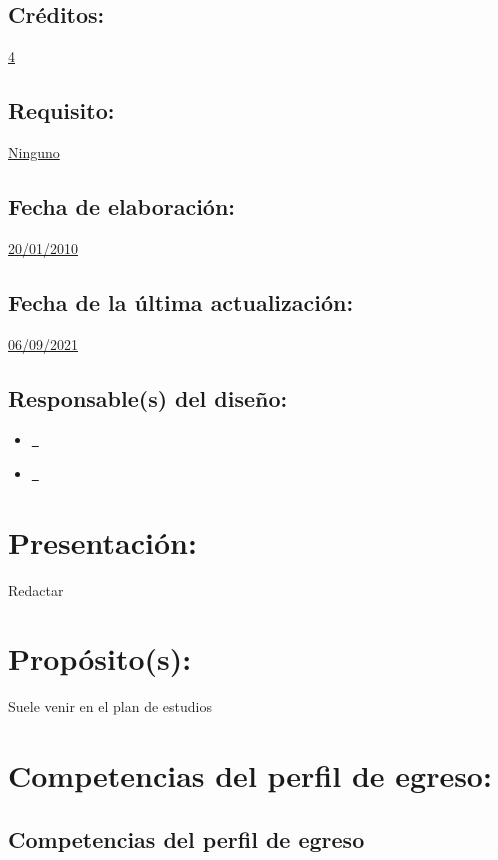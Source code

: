 \documentclass[10 pt]{article}
\begin{document}
\subsection{Cr\'{e}ditos:} \underline{4} %
\subsection{Requisito:} \underline{Ninguno} %
\subsection{Fecha de elaboraci\'{o}n:} \underline{20/01/2010}
\subsection{Fecha de la \'{u}ltima actualizaci\'{o}n:} \underline{06/09/2021}
\subsection{Responsable(s) del dise\~{n}o:}
\begin{itemize}[label={}]
\item \underline{\narturo~\arturo} %
\item \underline{\nelisa~\elisa} %
\end{itemize}
\newpage
\section{Presentaci\'{o}n:}

Redactar

\section{Prop\'{o}sito(s):}

Suele venir en el plan de estudios

\section{Competencias del perfil de egreso:}
\subsection{Competencias del perfil de egreso}

\quad

\end{document}
